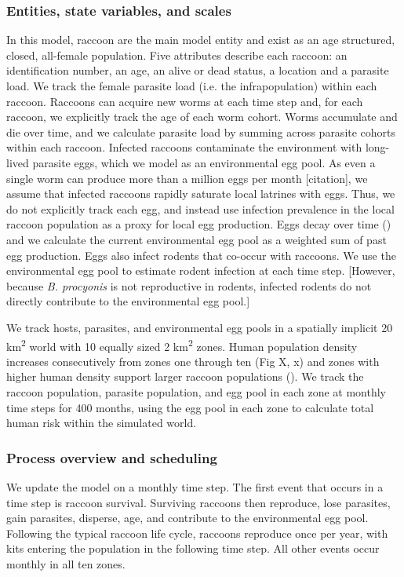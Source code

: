 \documentclass[11pt]{article}
\begin{document}
\subsubsection{Entities, state variables, and scales}

In this model, raccoon are the main model entity and exist as an age
structured, closed, all-female population. Five attributes describe each raccoon: an identification number, an age, an alive
or dead status, a location and a parasite load. We track the female parasite
load (i.e. the infrapopulation) within each raccoon. Raccoons can acquire new
worms at each time step and, for each raccoon, we explicitly track the age of each
worm cohort. Worms accumulate and die over time, and we
calculate parasite load by summing across parasite cohorts within each raccoon.
Infected raccoons contaminate the environment with long-lived parasite
eggs, which we model as an environmental egg pool. As even a single worm
can produce more than a million eggs per month [citation], we assume that infected
raccoons rapidly saturate local latrines with eggs. Thus, we do not
explicitly track each egg, and instead use infection prevalence in the
local raccoon population as a proxy for local egg production. Eggs decay
over time () and we calculate the current environmental egg pool as a
weighted sum of past egg production. Eggs also infect rodents that co-occur with raccoons. We use the
environmental egg pool to estimate rodent infection at each time step. [However, because \emph{B. procyonis} is not reproductive in rodents, infected rodents do not directly contribute to the environmental egg pool.]

We track hosts, parasites, and environmental egg pools in a spatially
implicit 20 km\textsuperscript{2} world with 10 equally sized 2
km\textsuperscript{2} zones. Human population density increases
consecutively from zones one through ten (Fig X, x) and zones with
higher human density support larger raccoon populations (). We track the
raccoon population, parasite population, and egg pool in each zone at
monthly time steps for 400 months, using the egg pool in each zone to
calculate total human risk within the simulated world.

\subsubsection{Process overview and scheduling}

We update the model on a monthly time step. The first event that occurs in a time step is raccoon survival. Surviving raccoons then reproduce, lose
parasites, gain parasites, disperse, age, and contribute to the
environmental egg pool. Following the typical raccoon life cycle,
raccoons reproduce once per year, with kits entering the population in
the following time step. All other events occur monthly in all ten
zones.
\end{document}
